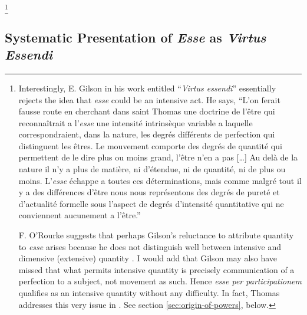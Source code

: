 \footnote{Interestingly, E. Gilson in his work entitled ``\emph{Virtus essendi}'' essentially rejects the idea that \emph{esse} could be an intensive act. He says, ``L'on ferait fausse route en cherchant dans saint Thomas une doctrine de l'être qui reconnaîtrait a l'\emph{esse} une intensité intrinsèque variable a laquelle correspondraient, dans la nature, les degrés différents de perfection qui distinguent les êtres. Le mouvement comporte des degrés de quantité qui permettent de le dire plus ou moins grand, l'être n'en a pas [\ldots]
Au delà de la nature il n'y a plus de matière, ni d'étendue, ni de quantité, ni de plus ou moins. L'\emph{esse} échappe a toutes ces déterminations, mais comme malgré tout il y a des différences d'être nous nous représentons des degrés de pureté et d'actualité formelle sous l'aspect de degrés d'intensité quantitative qui ne conviennent aucunement a l'être.'' 

F. O'Rourke suggests that perhaps Gilson's reluctance to attribute quantity to \emph{esse} arises because he does not distinguish well between intensive and dimensive (extensive) quantity \parencite[45]{orourke:virtus}. I would add that Gilson may also have missed that what permits intensive quantity is precisely communication of a perfection to a subject, not movement as such. Hence \emph{esse per participationem} qualifies as an intensive quantity without any difficulty.
In fact, Thomas addresses this very issue in \cite[I, q.~77, a.~6, ad 3]{st:summa}. See section \ref{sec:origin-of-powers}, below.}
%

\subsection{Systematic Presentation of \emph{Esse} as \emph{Virtus Essendi}}

